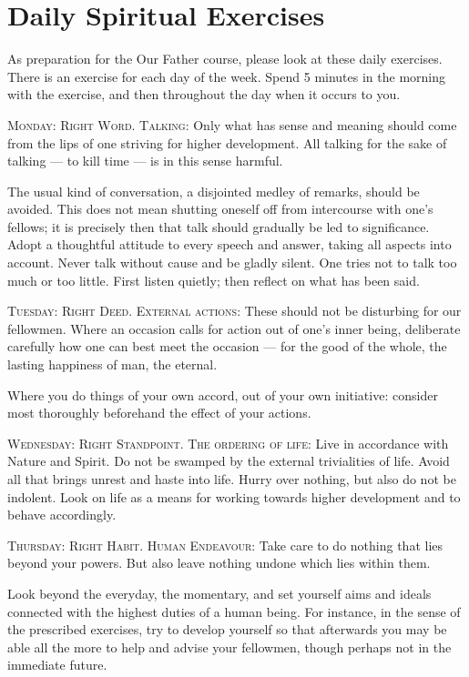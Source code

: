 \section{Daily Spiritual Exercises}

As preparation for the Our Father course, please look at these daily exercises. There is an exercise for each day of the
week. Spend 5 minutes in the morning with the exercise, and then throughout the day when it occurs to you.

\textsc{Monday: Right Word. Talking}: Only what has sense and meaning should come from the lips of one striving for higher development. All
talking for the sake of talking — to kill time — is in this sense harmful.

The usual kind of conversation, a disjointed medley of remarks, should be avoided. This does not mean shutting oneself
off from intercourse with one's fellows; it is precisely then that talk should gradually be led to
significance. Adopt a thoughtful attitude to every speech and answer, taking all aspects into account. Never talk
without cause and be gladly silent. One tries not to talk too much or too little. First listen quietly; then reflect on
what has been said.

\textsc{Tuesday: Right Deed. External actions}: These should not be disturbing for our fellowmen. Where an occasion calls for action out of
one's inner being, deliberate carefully how one can best meet the occasion —
for the good of the whole, the lasting happiness of man, the eternal.

Where you do things of your own accord, out of your own initiative: consider most thoroughly beforehand the effect of
your actions.

\textsc{Wednesday: Right Standpoint. The ordering of life}: Live in accordance with Nature and Spirit. Do not be swamped by the external trivialities
of life. Avoid all that brings unrest and haste into life. Hurry over nothing, but also do not be indolent. Look on
life as a means for working towards higher development and to behave accordingly.

\textsc{Thursday: Right Habit. Human Endeavour}: Take care to do nothing that lies beyond your powers. But also leave nothing undone which lies
within them.

Look beyond the everyday, the momentary, and set yourself aims and ideals connected with the highest duties of a human
being. For instance, in the sense of the prescribed exercises, try to develop yourself so that afterwards you may be
able all the more to help and advise your fellowmen, though perhaps not in the immediate future.

